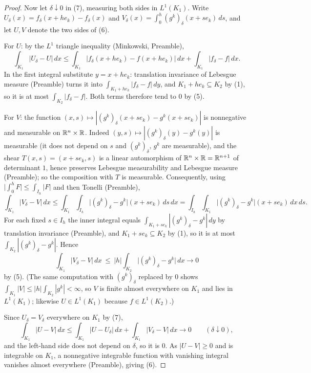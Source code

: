 \begin{proof}
Now let $\delta\downarrow0$ in (7), measuring both sides in $L^1(K_1)$.  Write
$U_\delta(x)=f_\delta(x+he_k)-f_\delta(x)$ and
$V_\delta(x)=\int_0^h(g^k)_\delta(x+se_k)\,ds$, and let $U,V$ denote the two
sides of (6).

For $U$: by the $L^1$ triangle inequality (Minkowski, Preamble),
\[
\int_{K_1}|U_\delta-U|\,dx
\le\int_{K_1}|f_\delta(x+he_k)-f(x+he_k)|\,dx+\int_{K_1}|f_\delta-f|\,dx .
\]
In the first integral substitute $y=x+he_k$: translation invariance of Lebesgue
measure (Preamble) turns it into $\int_{K_1+he_k}|f_\delta-f|\,dy$, and
$K_1+he_k\subseteq K_2$ by (1), so it is at most $\int_{K_2}|f_\delta-f|$.  Both
terms therefore tend to $0$ by (5).

For $V$: the function $(x,s)\mapsto|(g^k)_\delta(x+se_k)-g^k(x+se_k)|$ is
nonnegative and measurable on $\mathbb{R}^n\times\mathbb{R}$.  Indeed
$(y,s)\mapsto|(g^k)_\delta(y)-g^k(y)|$ is measurable (it does not depend on $s$
and $(g^k)_\delta$, $g^k$ are measurable), and the shear
$T(x,s)=(x+se_k,s)$ is a linear automorphism of $\mathbb{R}^n\times\mathbb{R}=\mathbb{R}^{n+1}$ of
determinant $1$, hence preserves Lebesgue measurability and Lebesgue measure
(Preamble); so the composition with $T$ is measurable.  Consequently, using
$\bigl|\int_0^hF\bigr|\le\int_{I_h}|F|$ and then Tonelli (Preamble),
\[
\int_{K_1}|V_\delta-V|\,dx
\le\int_{K_1}\!\!\int_{I_h}\bigl|(g^k)_\delta-g^k\bigr|(x+se_k)\,ds\,dx
=\int_{I_h}\!\!\int_{K_1}\bigl|(g^k)_\delta-g^k\bigr|(x+se_k)\,dx\,ds .
\]
For each fixed $s\in I_h$ the inner integral equals
$\int_{K_1+se_k}|(g^k)_\delta-g^k|\,dy$ by translation invariance (Preamble),
and $K_1+se_k\subseteq K_2$ by (1), so it is at most
$\int_{K_2}|(g^k)_\delta-g^k|$.  Hence
\[
\int_{K_1}|V_\delta-V|\,dx\ \le\ |h|\int_{K_2}\bigl|(g^k)_\delta-g^k\bigr|\,dx
\longrightarrow0
\]
by (5).  (The same computation with $(g^k)_\delta$ replaced by $0$ shows
$\int_{K_1}|V|\le|h|\int_{K_2}|g^k|<\infty$, so $V$ is finite almost everywhere
on $K_1$ and lies in $L^1(K_1)$; likewise $U\in L^1(K_1)$ because
$f\in L^1(K_2)$.)

Since $U_\delta=V_\delta$ everywhere on $K_1$ by (7),
\[
\int_{K_1}|U-V|\,dx
\le\int_{K_1}|U-U_\delta|\,dx+\int_{K_1}|V_\delta-V|\,dx
\longrightarrow0\qquad(\delta\downarrow0),
\]
and the left-hand side does not depend on $\delta$, so it is $0$.  As $|U-V|\ge0$
and is integrable on $K_1$, a nonnegative integrable function with vanishing
integral vanishes almost everywhere (Preamble), giving (6).


\end{proof}
